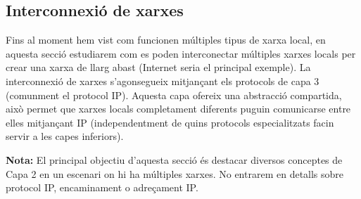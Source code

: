 \documentclass[12pt,a4paper]{article}
\begin{document}
\subsection{Interconnexió de xarxes}
Fins al moment hem vist com funcionen múltiples tipus de xarxa local, en aquesta secció estudiarem com es poden interconectar múltiples xarxes
locals per crear una xarxa de llarg abast (Internet seria el principal exemple). La interconnexió de xarxes s'agonsegueix
mitjançant els protocols de capa 3 (comunment el protocol IP). Aquesta capa ofereix una abstracció compartida, això permet
que xarxes locals completament diferents puguin comunicarse entre elles mitjançant IP (independentment de quins protocols especialitzats facin servir a les capes
inferiors).

\textbf{Nota:} El principal objectiu d'aquesta secció és destacar diversos conceptes de Capa 2 en un escenari on hi ha múltiples xarxes. No entrarem en detalls sobre protocol IP, encaminament o adreçament IP.
\end{document}
